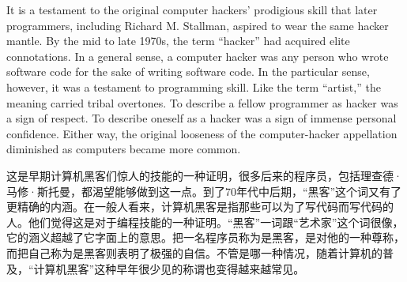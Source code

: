
\ifdefined\eng
It is a testament to the original computer hackers' prodigious skill that later programmers, including Richard M. Stallman, aspired to wear the same hacker mantle. By the mid to late 1970s, the term ``hacker'' had acquired elite connotations. In a general sense, a computer hacker was any person who wrote software code for the sake of writing software code. In the particular sense, however, it was a testament to programming skill. Like the term ``artist,'' the meaning carried tribal overtones. To describe a fellow programmer as hacker was a sign of respect. To describe oneself as a hacker was a sign of immense personal confidence. Either way, the original looseness of the computer-hacker appellation diminished as computers became more common.
\fi

\ifdefined\chs
这是早期计算机黑客们惊人的技能的一种证明，很多后来的程序员，包括理查德·马修·斯托曼，都渴望能够做到这一点。到了70年代中后期，``黑客''这个词又有了更精确的内涵。在一般人看来，计算机黑客是指那些可以为了写代码而写代码的人。他们觉得这是对于编程技能的一种证明。``黑客''一词跟``艺术家''这个词很像，它的涵义超越了它字面上的意思。把一名程序员称为是黑客，是对他的一种尊称，而把自己称为是黑客则表明了极强的自信。不管是哪一种情况，随着计算机的普及，``计算机黑客''这种早年很少见的称谓也变得越来越常见。
\fi

